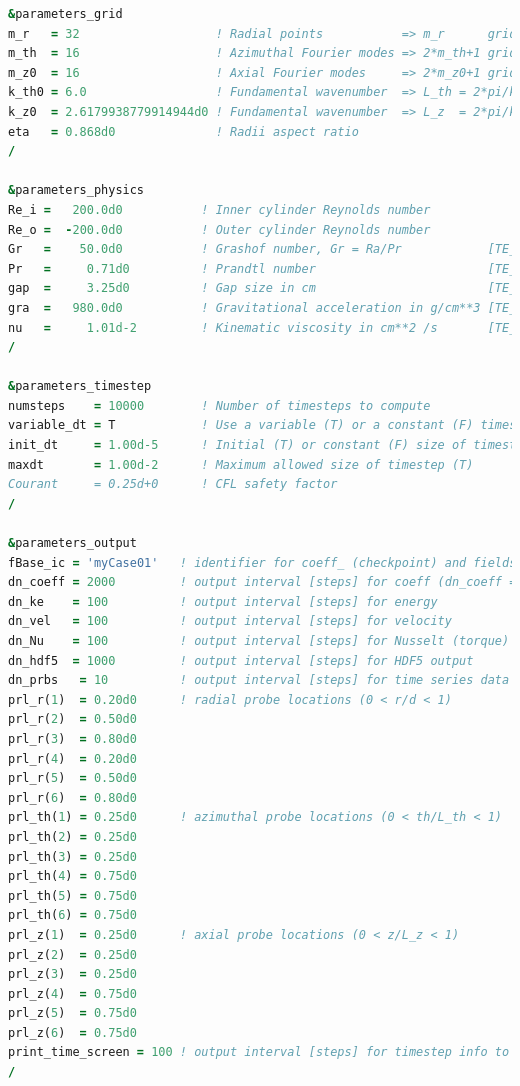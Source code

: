 \documentclass[a4paper, 11pt, DIV=11]{scrartcl}
\begin{document}
\begin{lstlisting}[language=fortran]
&parameters_grid
m_r   = 32                   ! Radial points           => m_r      grid points
m_th  = 16                   ! Azimuthal Fourier modes => 2*m_th+1 grid points
m_z0  = 16                   ! Axial Fourier modes     => 2*m_z0+1 grid points
k_th0 = 6.0                  ! Fundamental wavenumber  => L_th = 2*pi/k_th0
k_z0  = 2.6179938779914944d0 ! Fundamental wavenumber  => L_z  = 2*pi/k_z0
eta   = 0.868d0              ! Radii aspect ratio
/

&parameters_physics
Re_i =   200.0d0           ! Inner cylinder Reynolds number
Re_o =  -200.0d0           ! Outer cylinder Reynolds number
Gr   =    50.0d0           ! Grashof number, Gr = Ra/Pr            [TE_CODE only]
Pr   =     0.71d0          ! Prandtl number                        [TE_CODE only]
gap  =     3.25d0          ! Gap size in cm                        [TE_CODE only]
gra  =   980.0d0           ! Gravitational acceleration in g/cm**3 [TE_CODE only]
nu   =     1.01d-2         ! Kinematic viscosity in cm**2 /s       [TE_CODE only]
/

&parameters_timestep
numsteps    = 10000        ! Number of timesteps to compute
variable_dt = T            ! Use a variable (T) or a constant (F) timestep size
init_dt     = 1.00d-5      ! Initial (T) or constant (F) size of timestep
maxdt       = 1.00d-2      ! Maximum allowed size of timestep (T)
Courant     = 0.25d+0      ! CFL safety factor
/

&parameters_output
fBase_ic = 'myCase01'   ! identifier for coeff_ (checkpoint) and fields_ (hdf5) files
dn_coeff = 2000         ! output interval [steps] for coeff (dn_coeff = -1 disables ouput)
dn_ke    = 100          ! output interval [steps] for energy
dn_vel   = 100          ! output interval [steps] for velocity
dn_Nu    = 100          ! output interval [steps] for Nusselt (torque)
dn_hdf5  = 1000         ! output interval [steps] for HDF5 output
dn_prbs   = 10          ! output interval [steps] for time series data at probe locations
prl_r(1)  = 0.20d0      ! radial probe locations (0 < r/d < 1)
prl_r(2)  = 0.50d0
prl_r(3)  = 0.80d0
prl_r(4)  = 0.20d0
prl_r(5)  = 0.50d0
prl_r(6)  = 0.80d0
prl_th(1) = 0.25d0      ! azimuthal probe locations (0 < th/L_th < 1)
prl_th(2) = 0.25d0
prl_th(3) = 0.25d0
prl_th(4) = 0.75d0
prl_th(5) = 0.75d0
prl_th(6) = 0.75d0
prl_z(1)  = 0.25d0      ! axial probe locations (0 < z/L_z < 1)
prl_z(2)  = 0.25d0
prl_z(3)  = 0.25d0
prl_z(4)  = 0.75d0
prl_z(5)  = 0.75d0
prl_z(6)  = 0.75d0
print_time_screen = 100 ! output interval [steps] for timestep info to stdout
/


\end{lstlisting}
\end{document}

